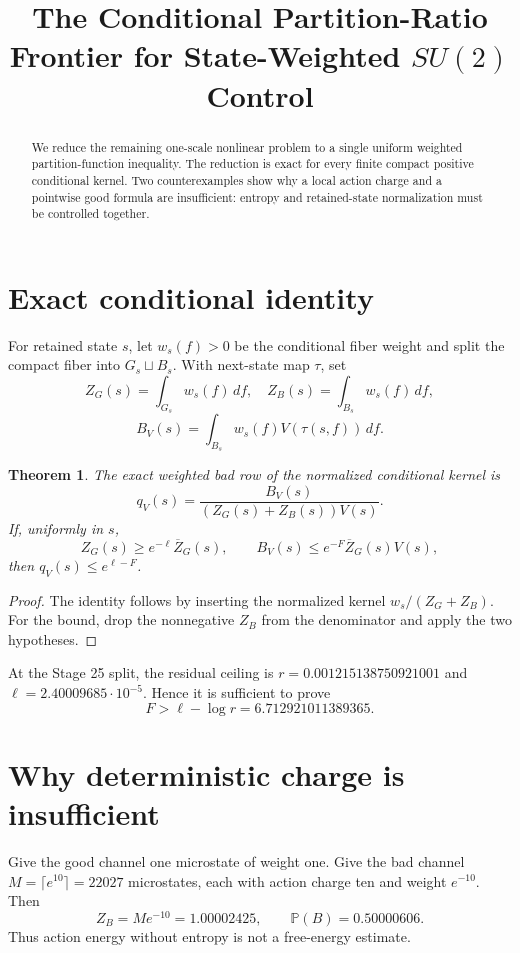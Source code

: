 \documentclass[11pt]{article}
\title{The Conditional Partition-Ratio Frontier for State-Weighted $SU(2)$ Control}
\author{}
\date{}
\newtheorem{theorem}{Theorem}
\begin{document}
\maketitle

\begin{abstract}
We reduce the remaining one-scale nonlinear problem to a single uniform
weighted partition-function inequality.  The reduction is exact for every
finite compact positive conditional kernel.  Two counterexamples show why a
local action charge and a pointwise good formula are insufficient: entropy
and retained-state normalization must be controlled together.
\end{abstract}

\section{Exact conditional identity}
For retained state $s$, let $w_s(f)>0$ be the conditional fiber weight and
split the compact fiber into $G_s\sqcup B_s$.  With next-state map $\tau$, set
\[
 Z_G(s)=\int_{G_s}w_s(f)\,df,\quad
 Z_B(s)=\int_{B_s}w_s(f)\,df,
\]
\[
 B_V(s)=\int_{B_s}w_s(f)V(\tau(s,f))\,df.
\]

\begin{theorem}
The exact weighted bad row of the normalized conditional kernel is
\[
 q_V(s)=\frac{B_V(s)}{(Z_G(s)+Z_B(s))V(s)}.
\]
If, uniformly in $s$,
\[
 Z_G(s)\ge e^{-\ell}\overline Z_G(s),\qquad
 B_V(s)\le e^{-F}\overline Z_G(s)V(s),
\]
then $q_V(s)\le e^{\ell-F}$.
\end{theorem}
\begin{proof}
The identity follows by inserting the normalized kernel
$w_s/(Z_G+Z_B)$.  For the bound, drop the nonnegative $Z_B$ from the
denominator and apply the two hypotheses.
\end{proof}

At the Stage 25 split, the residual ceiling is
$r=0.001215138750921001$ and $\ell=2.40009685\cdot10^{-5}$.  Hence it is
sufficient to prove
\[
 F>\ell-\log r=6.712921011389365.
\]

\section{Why deterministic charge is insufficient}
Give the good channel one microstate of weight one.  Give the bad channel
$M=\lceil e^{10}\rceil=22027$ microstates, each with action charge ten and
weight $e^{-10}$.  Then
\[
 Z_B=Me^{-10}=1.00002425,\qquad
 \mathbb P(B)=0.50000606.
\]
Thus action energy without entropy is not a free-energy estimate.
\end{document}
